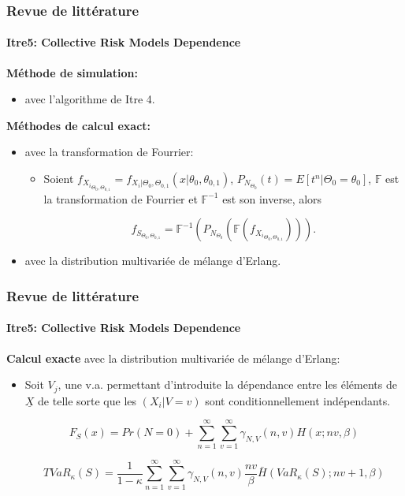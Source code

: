 \documentclass[11pt]{beamer}
\begin{document}
\begin{frame}
	\frametitle{Revue de littérature}
	\framesubtitle{Itre5: Collective Risk Models Dependence \cite{Itre5}}
	
	\textbf{Méthode de simulation:}
	\begin{itemize}
		\item avec l'algorithme de Itre 4.
	\end{itemize}
	\vspace{0.2cm}
	
	\textbf{Méthodes de calcul exact:}
	\begin{itemize}
		\item avec la transformation de Fourrier:
		\begin{itemize}
			\item Soient $f_{{X_i}_{\Theta_0, \Theta_{0,1}}} = f_{X_i|\Theta_0, \Theta_{0,1}}(x| \theta_0, \theta_{0,1})$, $P_{N_{\Theta_0}}(t) = E[t^n|\Theta_0 = \theta_0]$, $\mathbb{F}$ est la transformation de Fourrier et $\mathbb{F}^{-1}$ est son inverse, alors
		
			\begin{equation*}
				f_{S_{\Theta_0, \Theta_{0,1}}} = \mathbb{F}^{-1} \left(
					P_{N_{\Theta_0}}\left(
						\mathbb{F} \left(
							f_{{X_i}_{\Theta_0, \Theta_{0,1}}}
				\right) \right) \right).
			\end{equation*}
		\end{itemize}
		\item avec la distribution multivariée de mélange d'Erlang.
		
	\end{itemize}

	
	
\end{frame}


\begin{frame}
	\frametitle{Revue de littérature}
	\framesubtitle{Itre5: Collective Risk Models Dependence \cite{Itre5}}
	
	\textbf{Calcul exacte} avec la distribution multivariée de mélange d'Erlang:\\
	
	\begin{itemize}
		\item Soit $V_j$, une v.a. permettant d'introduite la dépendance entre les éléments de $\underline{X}$ de telle sorte que les $(X_i|V=v)$ sont conditionnellement indépendants.
		
		\begin{equation*}
		F_S(x) = Pr(N=0) + \sum_{n=1}^{\infty} \sum_{v=1}^{\infty} \gamma_{N,V}(n,v) H(x; nv, \beta)
		\end{equation*}
		
		\begin{equation*}
		TVaR_{\kappa}(S) = \frac{1}{1-\kappa} \sum_{n=1}^{\infty} \sum_{v=1}^{\infty} \gamma_{N,V}(n,v) \frac{nv}{\beta} \bar{H}(VaR_{\kappa}(S); nv + 1, \beta)
		\end{equation*}
		
	\end{itemize}
\end{frame}
\end{document}
